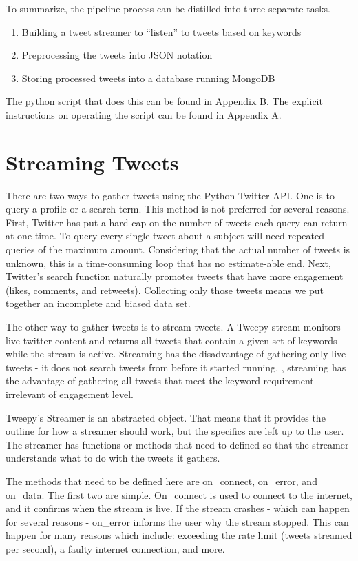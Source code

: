\documentclass[11pt, twoside, reqno]{book}
\begin{document}
To summarize, the pipeline process can be distilled into three separate tasks. 
\begin{enumerate}
	\item Building a tweet streamer to ``listen'' to tweets based on keywords
	\item Preprocessing the tweets into JSON notation
	\item Storing processed tweets into a database running MongoDB 
\end{enumerate}
The python script that does this can be found in Appendix B. The explicit instructions on operating the script can be found in Appendix A. 


\section{Streaming Tweets}
\label{sec:streaming}
\hspace{0.2in} There are two ways to gather tweets using the Python Twitter API. One is to query a profile or a search term\cite{twitter}. This method is not preferred for several reasons. First, Twitter has put a hard cap on the number of tweets each query can return at one time. To query every single tweet about a subject will need repeated queries of the maximum amount\cite{twitter}. Considering that the actual number of tweets is unknown, this is a time-consuming loop that has no estimate-able end. Next, Twitter's search function naturally promotes tweets that have more engagement (likes, comments, and retweets). Collecting only those tweets means we put together an incomplete and biased data set. 

The other way to gather tweets is to stream tweets\cite{twitter}. A Tweepy stream monitors live twitter content and returns all tweets that contain a given set of keywords while the stream is active. Streaming has the disadvantage of gathering only live tweets - it does not search tweets from before it started running. , streaming has the advantage of gathering all tweets that meet the keyword requirement irrelevant of engagement level. 

Tweepy's Streamer is an abstracted object\cite{twitter}. That means that it provides the outline for how a streamer should work, but the specifics are left up to the user. The streamer has functions or methods that need to defined so that the streamer understands what to do with the tweets it gathers. 

The methods that need to be defined here are on\_connect, on\_error, and on\_data. The first two are simple. On\_connect is used to connect to the internet, and it confirms when the stream is live. If the stream crashes - which can happen for several reasons - on\_error informs the user why the stream stopped. This can happen for many reasons which include: exceeding the rate limit (tweets streamed per second), a faulty internet connection, and more. 
\end{document}
